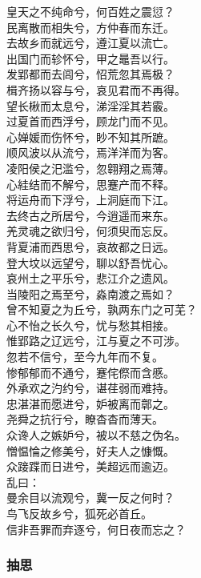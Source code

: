 \documentclass[]{article}
\begin{document}
皇天之不纯命兮，何百姓之震愆？\\
民离散而相失兮，方仲春而东迁。\\
去故乡而就远兮，遵江夏以流亡。\\
出国门而轸怀兮，甲之鼂吾以行。\\
发郢都而去闾兮，怊荒忽其焉极？\\
楫齐扬以容与兮，哀见君而不再得。\\
望长楸而太息兮，涕淫淫其若霰。\\
过夏首而西浮兮，顾龙门而不见。\\
心婵媛而伤怀兮，眇不知其所蹠。\\
顺风波以从流兮，焉洋洋而为客。\\
凌阳侯之汜滥兮，忽翱翔之焉薄。\\
心絓结而不解兮，思蹇产而不释。\\
将运舟而下浮兮，上洞庭而下江。\\
去终古之所居兮，今逍遥而来东。\\
羌灵魂之欲归兮，何须臾而忘反。\\
背夏浦而西思兮，哀故都之日远。\\
登大坟以远望兮，聊以舒吾忧心。\\
哀州土之平乐兮，悲江介之遗风。\\
当陵阳之焉至兮，淼南渡之焉如？\\
曾不知夏之为丘兮，孰两东门之可芜？\\
心不怡之长久兮，忧与愁其相接。\\
惟郢路之辽远兮，江与夏之不可涉。\\
忽若不信兮，至今九年而不复。\\
惨郁郁而不通兮，蹇侘傺而含慼。\\
外承欢之汋约兮，谌荏弱而难持。\\
忠湛湛而愿进兮，妒被离而鄣之。\\
尧舜之抗行兮，瞭杳杳而薄天。\\
众谗人之嫉妒兮，被以不慈之伪名。\\
憎愠惀之修美兮，好夫人之慷慨。\\
众踥蹀而日进兮，美超远而逾迈。\\
乱曰：\\
曼余目以流观兮，冀一反之何时？\\
鸟飞反故乡兮，狐死必首丘。\\
信非吾罪而弃逐兮，何日夜而忘之？

\hypertarget{header-n2856}{%
\subsubsection{抽思}\label{header-n2856}}
\end{document}
